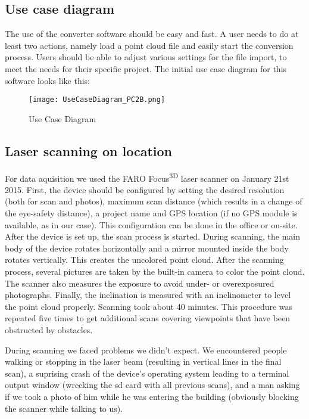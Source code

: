 \subsection{Use case diagram}

The use of the converter software should be easy and fast. A user needs to do at least two actions, namely load a point cloud file and easily start the conversion process. Users should be able to adjust various settings for the file import, to meet the needs for their specific project. The initial use case diagram for this software looks like this:

\begin{figure}[h]
	\centering
	\texttt{[image: UseCaseDiagram\_PC2B.png]}
	\caption{Use Case Diagram}
	\label{fig:use_case}
\end{figure}


\subsection{Laser scanning on location}

For data aquisition we used the FARO Focus\textsuperscript{3D} laser scanner on January 21st 2015. First, the device should be configured by setting the desired resolution (both for scan and photos), maximum scan distance (which results in a change of the eye-safety distance), a project name and GPS location (if no GPS module is available, as in our case). This configuration can be done in the office or on-site. After the device is set up, the scan process is started. During scanning, the main body of the device rotates horizontally and a mirror mounted inside the body rotates vertically. This creates the uncolored point cloud. After the scanning process, several pictures are taken by the built-in camera to color the point cloud. The scanner also measures the exposure to avoid under- or overexposured photographs. Finally, the inclination is measured with an inclinometer to level the point cloud properly. Scanning took about 40 minutes.
This procedure was repeated five times to get additional scans covering viewpoints that have been obstructed by obstacles.

During scanning we faced problems we didn't expect. We encountered people walking or stopping in the laser beam (resulting in vertical lines in the final scan), a suprising crash of the device's operating system leading to a terminal output window (wrecking the sd card with all previous scans), and a man asking if we took a photo of him while he was entering the building (obviously blocking the scanner while talking to us).

